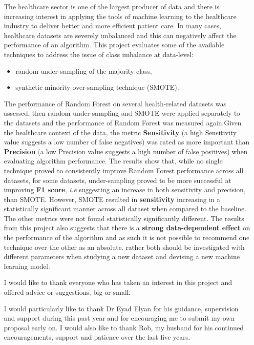 \beforeabstract
{}

The healthcare sector is one of the largest producer of data and there is increasing interest in applying the tools of machine learning to the healthcare industry to deliver better and more efficient patient care. In many cases, healthcare datasets are severely imbalanced and this can negatively affect the performance of an algorithm.\newline
This project evaluates some of the available techniques to address the issue of class imbalance at data-level:
\begin{itemize}
    \item random under-sampling of the majority class,
    \item  synthetic minority over-sampling technique (SMOTE).
\end{itemize}

The performance of Random Forest on several health-related datasets was assessed, then random under-sampling and SMOTE were applied separately to the datasets and the performance of Random Forest was measured again.\newline Given the healthcare context of the data, the metric \textbf{Sensitivity} (a high Sensitivity value suggests a low number of false negatives) was rated as more important than \textbf{Precision} (a low Precision value suggests a high number of false positives) when evaluating algorithm performance.\newline
The results show that, while no single technique proved to consistently improve Random Forest performance across all datasets, for some datasets, under-sampling proved to be more successful at improving\textbf{ F1 score}, \textit{i.e} suggesting an increase in both sensitivity and precision, than SMOTE. However, SMOTE resulted in \textbf{sensitivity} increasing in a statistically significant manner across all dataset when compared to the baseline. The other metrics were not found statistically significantly different.\newline
The results from this project also suggests that there is a \textbf{strong data-dependent effect} on the performance of the algorithm and as such it is not possible to recommend one technique over the other as an absolute, rather both should be investigated with different parameters when studying a new dataset and devising a new machine learning model.\newline




I would like to thank everyone who has taken an interest in this project and offered advice or suggestions, big or small. 

I would particularly like to thank Dr Eyad Elyan for his guidance, supervision and support during this past year and for encouraging me to submit my own proposal early on.
I would also like to thank Rob, my husband for his continued encouragements, support and patience over the last five years.


\afterpreface \afterabstract
